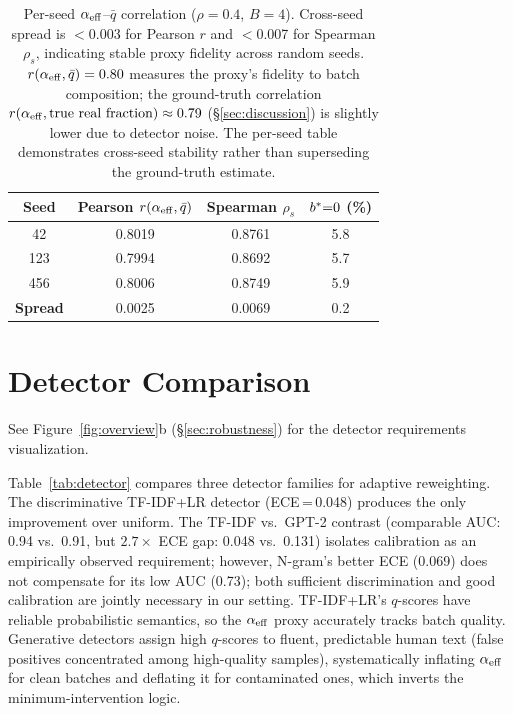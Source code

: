 \begin{table}[h]
\centering
\small
\begin{tabular}{@{}cccc@{}}
\toprule
\textbf{Seed} & Pearson $r(\alpha_{\mathrm{eff}}, \bar{q})$ & Spearman $\rho_s$ & $b^*{=}0$ (\%) \\
\midrule
42  & 0.8019 & 0.8761 & 5.8 \\
123 & 0.7994 & 0.8692 & 5.7 \\
456 & 0.8006 & 0.8749 & 5.9 \\
\midrule
\textbf{Spread} & 0.0025 & 0.0069 & 0.2 \\
\bottomrule
\end{tabular}
\caption{Per-seed $\alpha_{\mathrm{eff}}$--$\bar{q}$ correlation ($\rho{=}0.4$, $B{=}4$).
Cross-seed spread is $<$0.003 for Pearson $r$ and $<$0.007 for Spearman $\rho_s$, indicating stable proxy fidelity across random seeds.
$r(\alpha_{\mathrm{eff}}, \bar{q}) = 0.80$ measures the proxy's fidelity to batch composition; the ground-truth correlation $r(\alpha_{\mathrm{eff}}, \text{true real fraction}) \approx 0.79$ (\S\ref{sec:discussion}) is slightly lower due to detector noise.
The per-seed table demonstrates cross-seed stability rather than superseding the ground-truth estimate.}
\label{tab:alpha_corr_perseed}
\end{table}

\section{Detector Comparison}
\label{app:detector}

See Figure~\ref{fig:overview}b (\S\ref{sec:robustness}) for the detector requirements visualization.

Table~\ref{tab:detector} compares three detector families for adaptive reweighting.
The discriminative TF-IDF+LR detector (ECE\,=\,0.048) produces the only improvement over uniform.
The TF-IDF vs.\ GPT-2 contrast (comparable AUC: 0.94 vs.\ 0.91, but $2.7{\times}$ ECE gap: 0.048 vs.\ 0.131) isolates calibration as an empirically observed requirement; however, N-gram's better ECE (0.069) does not compensate for its low AUC (0.73); both sufficient discrimination and good calibration are jointly necessary in our setting.
TF-IDF+LR's $q$-scores have reliable probabilistic semantics, so the $\alpha_{\mathrm{eff}}$ proxy accurately tracks batch quality.
Generative detectors assign high $q$-scores to fluent, predictable human text (false positives concentrated among high-quality samples), systematically inflating $\alpha_{\mathrm{eff}}$ for clean batches and deflating it for contaminated ones, which inverts the minimum-intervention logic.

